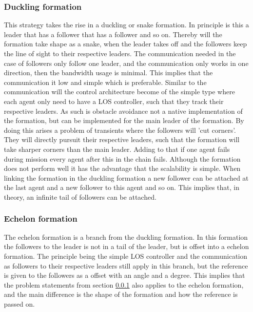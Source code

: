 \subsubsection{Duckling formation}
\label{sc:duckling}
This strategy takes the rise in a duckling or snake formation. In principle is this a leader that has a follower that has a follower and so on. Thereby will the formation take shape as a snake, when the leader takes off and the followers keep the line of sight to their respective leaders. The communication needed in the case of followers only follow one leader, and the communication only works in one direction, then the bandwidth usage is minimal. This implies that the communication it low and simple which is preferable. Similar to the communication will the control architecture become of the simple type where each agent only need to have a \ac{LOS} controller, such that they track their respective leaders. As such is obstacle avoidance not a native implementation of the formation, but can be implemented for the main leader of the formation. By doing this arises a problem of transients where the followers will 'cut corners'. They will directly pursuit their respective leaders, such that the formation will take sharper corners than the main leader. Adding to that if one agent fails during mission every agent after this in the chain fails. Although the formation does not perform well it has the advantage that the scalability is simple. When linking the formation in the duckling formation a new follower can be attached at the last agent and a new follower to this agent and so on. This implies that, in theory, an infinite tail of followers can be attached.

\subsubsection{Echelon formation}
The echelon formation is a branch from the duckling formation. In this formation the followers to the leader is not in a tail of the leader, but is offset into a echelon formation. The principle being the simple \ac{LOS} controller and the communication as followers to their respective leaders still apply in this branch, but the reference is given to the followers as a offset with an angle and a degree. This implies that the problem statements from section \ref{sc:duckling} also applies to the echelon formation, and the main difference is the shape of the formation and how the reference is passed on.

